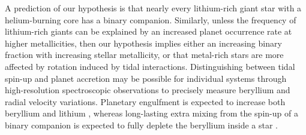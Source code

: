 \documentclass[twocolumn]{aastex62}
\begin{document}
A prediction of our hypothesis is that nearly every lithium-rich giant star
with a helium-burning core has a binary companion. Similarly, unless 
the frequency of lithium-rich giants can be explained by an increased planet 
occurrence rate at higher metallicities,
then our hypothesis implies either an increasing binary fraction with increasing stellar 
metallicity, or that metal-rich stars are more affected by rotation induced by
tidal interactions.
Distinguishing between tidal spin-up and planet accretion may be possible for 
individual systems through high-resolution spectroscopic observations
to precisely measure beryllium and radial velocity variations. Planetary 
engulfment is expected to increase both beryllium and lithium \citep{Siess_1999,
Melo_2005}, whereas long-lasting extra mixing from the spin-up of a binary 
companion is expected to fully deplete the beryllium inside a star \citep{Sackmann_1999}. 









\end{document}
